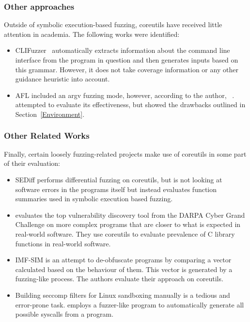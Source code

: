 \documentclass{article}
\let\savedCite=\cite
\renewcommand{\cite}{\unskip~\savedCite}
\begin{document}
\begin{multicols}{2}
    \subsubsection{Other approaches}

    Outside of symbolic execution-based fuzzing, coreutils have received little attention in academia. The following works were identified:

    \begin{itemize}
        \item CLIFuzzer\cite{CLIFuzzer} automatically extracts information about the command line interface from the program in question and then generates inputs based on this grammar. However, it does not take coverage information or any other guidance heuristic into account.
        \item AFL included an argv fuzzing mode, however, according to the author, \cite{AFLPlusPlusargv}. \citeauthor{AFLCoreutils} attempted to evaluate its effectiveness, but showed the drawbacks outlined in Section~\ref{Environment}.\cite{AFLCoreutils}
    \end{itemize}

    \subsubsection{Other Related Works}

    Finally, certain loosely fuzzing-related projects make use of coreutils in some part of their evaluation:

    \begin{itemize}
        \item SEDiff performs differential fuzzing on coreutils, but is not looking at software errors in the programs itself but instead evaluates function summaries used in symbolic execution based fuzzing.\cite{SEDiff}
        \item \citeauthor{DarpaExtended} evaluates the top vulnerability discovery tool from the DARPA Cyber Grand Challenge on more complex programs that are closer to what is expected in real-world software. They use coreutils to evaluate prevalence of C library functions in real-world software.\cite{DarpaExtended}
        \item IMF-SIM is an attempt to de-obfuscate programs by comparing a vector calculated based on the behaviour of them. This vector is generated by a fuzzing-like process. The authors evaluate their approach on coreutils.\cite{IMF-SIM}
        \item Building seccomp filters for Linux sandboxing manually is a tedious and error-prone task. \citeauthor{Seccomp} employs a fuzzer-like program to automatically generate all possible syscalls from a program.\cite{Seccomp}
    \end{itemize}


\end{multicols}
\end{document}
